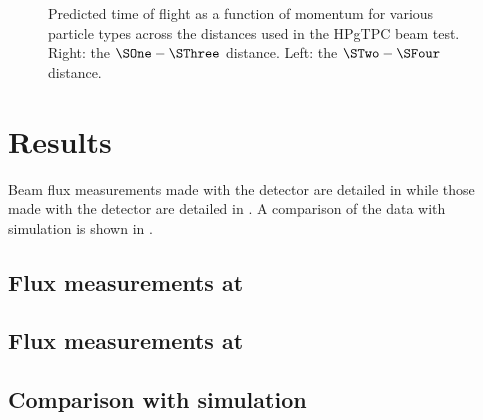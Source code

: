 \begin{figure}[h]
  \begin{minipage}[t]{.5\linewidth}
    \begin{adjustbox}{max totalsize=\textwidth, center}
      
    \end{adjustbox}
  \end{minipage}
  \hfill
  \begin{minipage}[t]{.5\linewidth}
    \begin{adjustbox}{max totalsize=\textwidth, center}
      
    \end{adjustbox}
  \end{minipage}
  \caption[Predicted time of flight as a function of momentum for various particle types across the distances used in the HPgTPC beam test]{Predicted time of flight as a function of momentum for various particle types across the distances used in the HPgTPC beam test. Right: the $\SOne - \SThree$ distance. Left: the $\STwo - \SFour$ distance.}
  \label{fig:tofVsMom}
\end{figure}


\section{Results}
\label{sec:hptpc_beam_flux:results}

Beam flux measurements made with the \SThree detector are detailed in  while those made with the \SFour detector are detailed in .
A comparison of the data with simulation is shown in .

\subsection{Flux measurements at \SThree}
\label{sec:hptpc_beam_flux:results:s3}

\subsection{Flux measurements at \SFour}
\label{sec:hptpc_beam_flux:results:s4}

\subsection{Comparison with simulation}
\label{sec:hptpc_beam_flux:results:MCData}

